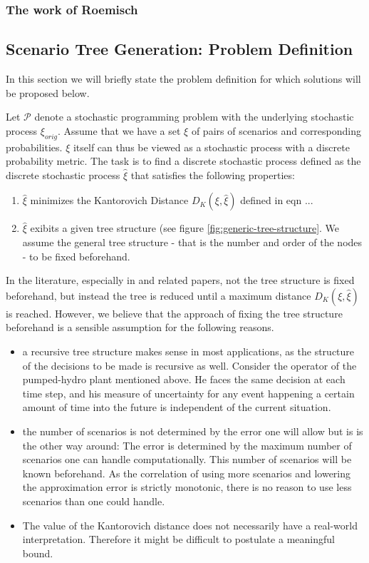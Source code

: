 \documentclass[a4paper, 12pt] {article}
\begin{document}
\subsubsection{The work of Roemisch}
\subsection{Scenario Tree Generation: Problem Definition}
In this section we will briefly state the problem definition for which solutions will be proposed below.

Let $\mathcal{P}$ denote a stochastic programming problem with the underlying stochastic process $\xi_{orig}$. Assume that we have a set $\xi$ of pairs of scenarios and corresponding probabilities. $\xi$ itself can thus be viewed as a stochastic process with a discrete probability metric. The task is to find a discrete stochastic process defined as the discrete stochastic process $\hat{\xi}$ that satisfies the following properties:
\begin{enumerate}
\item $\hat{\xi}$ minimizes the Kantorovich Distance $D_K(\xi,\hat{\xi})$ defined in eqn ...
\item $\hat{\xi}$ exibits a given tree structure (see figure \ref{fig:generic-tree-structure}. We assume the general tree structure - that is the number and order of the nodes - to be fixed beforehand. 
\end{enumerate}
In the literature, especially in \cite{Heitsch2009} and related papers, not the tree structure is fixed beforehand, but instead the tree is reduced until a maximum distance $D_K(\xi,\hat{\xi})$ is reached. However, we believe that the approach of fixing the tree structure beforehand is a sensible assumption for the following reasons.
\begin{itemize}
\item a recursive tree structure makes sense in most applications, as the structure of the decisions to be made is recursive as well. Consider the operator of the pumped-hydro plant mentioned above. He faces the same decision at each time step, and his measure of uncertainty for any event happening a certain amount of time into the future is independent of the current situation.
\item the number of scenarios is not determined by the error one will allow but is is the other way around: The error is determined by the maximum number of scenarios one can handle computationally. This number of scenarios will be known beforehand. As the correlation of using more scenarios and lowering the approximation error is strictly monotonic, there is no reason to use less scenarios than one could handle.
\item The value of the Kantorovich distance does not necessarily have a real-world interpretation. Therefore it might be difficult to postulate a meaningful bound.
\end{itemize}
\end{document}
